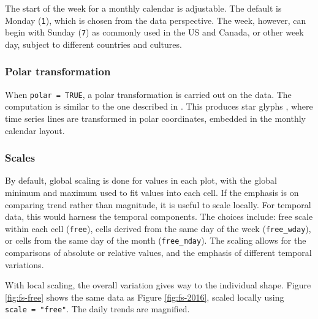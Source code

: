 \documentclass[12pt]{article}
\begin{document}
The start of the week for a monthly calendar is adjustable. The default is Monday (\texttt{1}), which is chosen from the data perspective. The week, however, can begin with Sunday (\texttt{7}) as commonly used in the US and Canada, or other week day, subject to different countries and cultures.

\hypertarget{polar-transformation}{%
\subsubsection{Polar transformation}\label{polar-transformation}}

When \texttt{polar\ =\ TRUE}, a polar transformation is carried out on the data. The computation is similar to the one described in \citet{Wickham2012glyph}. This produces star glyphs \citep{chambers2017graphical}, where time series lines are transformed in polar coordinates, embedded in the monthly calendar layout.



\hypertarget{scales}{%
\subsubsection{Scales}\label{scales}}

By default, global scaling is done for values in each plot, with the global minimum and maximum used to fit values into each cell. If the emphasis is on comparing trend rather than magnitude, it is useful to scale locally. For temporal data, this would harness the temporal components. The choices include: free scale within each cell (\texttt{free}), cells derived from the same day of the week (\texttt{free\_wday}), or cells from the same day of the month (\texttt{free\_mday}). The scaling allows for the comparisons of absolute or relative values, and the emphasis of different temporal variations.

With local scaling, the overall variation gives way to the individual shape. Figure \ref{fig:fs-free} shows the same data as Figure \ref{fig:fs-2016}, scaled locally using \texttt{scale\ =\ "free"}. The daily trends are magnified.
\end{document}
